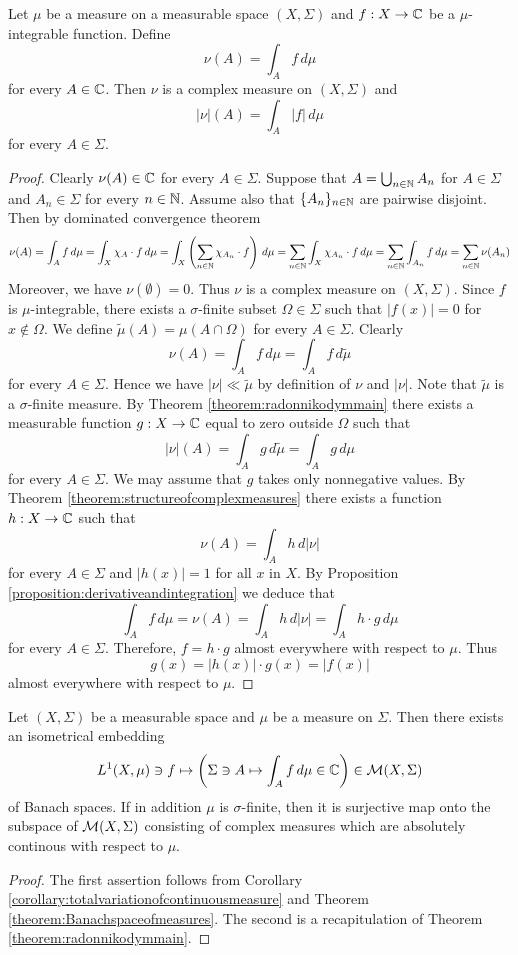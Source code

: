 \begin{corollary}\label{corollary:totalvariationofcontinuousmeasure}
Let $\mu$ be a measure on a measurable space $(X,\Sigma)$ and $f:X\rightarrow {\mathbb C}$ be a $\mu$-integrable function. Define
$$\nu(A) = \int_Af\,d\mu$$
for every $A\in {\mathbb C}$. Then $\nu$ is a complex measure on $(X,\Sigma)$ and
$$|\nu|(A) = \int_A|f|\,d\mu$$
for every $A\in \Sigma$.
\end{corollary}
\begin{proof}
Clearly $\nu(A)\in {\mathbb C}$ for every $A\in \Sigma$. Suppose that $A = \bigcup_{n\in {\mathbb N}}A_n$ for $A\in \Sigma$ and $A_n\in \Sigma$ for every $n\in {\mathbb N}$. Assume also that $\{A_n\}_{n\in {\mathbb N}}$ are pairwise disjoint. Then by dominated convergence theorem
$$\nu(A) = \int_A f\,d\mu = \int_X\chi_A\cdot f\,d\mu = \int_X\left(\sum_{n\in {\mathbb N}}\chi_{A_n}\cdot f\right)\,d\mu = \sum_{n\in {\mathbb N}}\int_X\chi_{A_n}\cdot f\,d\mu = \sum_{n\in {\mathbb N}}\int_{A_n}f\,d\mu = \sum_{n\in {\mathbb N}}\nu(A_n)$$
Moreover, we have $\nu(\emptyset) = 0$. Thus $\nu$ is a complex measure on $(X,\Sigma)$. Since $f$ is $\mu$-integrable, there exists a $\sigma$-finite subset $\Omega\in \Sigma$ such that $|f(x)|= 0$ for $x\not \in \Omega$. We define $\tilde{\mu}(A) = \mu(A\cap \Omega)$ for every $A\in \Sigma$. Clearly
$$\nu(A) = \int_Af\,d\mu = \int_Af\,d\tilde{\mu}$$
for every $A\in \Sigma$. Hence we have $|\nu|\ll\tilde{\mu}$ by definition of $\nu$ and $|\nu|$. Note that $\tilde{\mu}$ is a $\sigma$-finite measure. By Theorem \ref{theorem:radonnikodymmain} there exists a measurable function $g:X\rightarrow {\mathbb C}$ equal to zero outside $\Omega$ such that
$$|\nu|(A) = \int_Ag\,d\tilde{\mu} = \int_Ag\,d\mu$$
for every $A\in \Sigma$. We may assume that $g$ takes only nonnegative values. By Theorem \ref{theorem:structureofcomplexmeasures} there exists a function $h:X\rightarrow {\mathbb C}$ such that
$$\nu(A) = \int_Ah\,d|\nu|$$
for every $A\in \Sigma$ and $|h(x)|=1$ for all $x$ in $X$. By Proposition \ref{proposition:derivativeandintegration} we deduce that
$$\int_Af\,d\mu = \nu(A) = \int_Ah\,d|\nu| = \int_Ah\cdot g\,d\mu$$
for every $A\in \Sigma$. Therefore, $f = h\cdot g$ almost everywhere with respect to $\mu$. Thus
$$g(x) = |h(x)|\cdot g(x) = |f(x)|$$
almost everywhere with respect to $\mu$.
\end{proof}

\begin{corollary}
Let $(X,\Sigma)$ be a measurable space and $\mu$ be a measure on $\Sigma$. Then there exists an isometrical embedding
$$L^1(X,\mu)\ni f\mapsto \left(\Sigma \ni A \mapsto \int_Af\,d\mu\in {\mathbb C}\right)\in {\mathcal M}(X,\Sigma)$$
of Banach spaces. If in addition $\mu$ is $\sigma$-finite, then it is surjective map onto the subspace of ${\mathcal M}(X,\Sigma)$ consisting of complex measures which are absolutely continous with respect to $\mu$.
\end{corollary}
\begin{proof}
The first assertion follows from Corollary \ref{corollary:totalvariationofcontinuousmeasure} and Theorem \ref{theorem:Banachspaceofmeasures}. The second is a recapitulation of Theorem \ref{theorem:radonnikodymmain}.
\end{proof}


\small



